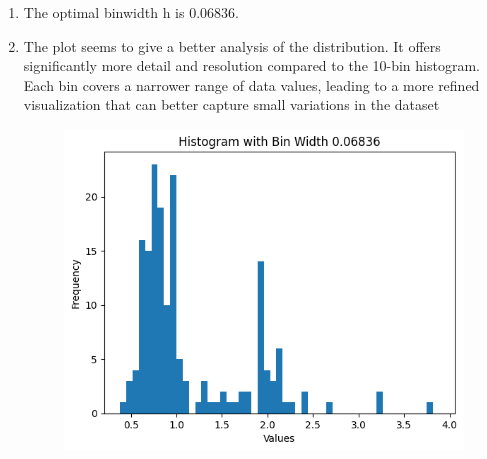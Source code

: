 \begin{enumerate}[label=(\alph*)]
\begin{figure}[H]
	      \end{figure}
	\item  The optimal binwidth h is 0.06836.
	\item  The plot seems to give a better analysis of the distribution. It  offers
	      significantly more detail and resolution compared to the 10-bin histogram. Each
	      bin covers a narrower range of data values, leading to a more refined
	      visualization that can better capture small variations in the dataset
	      \begin{figure}[H]
		      \centering
		      \includegraphics[width=0.7\linewidth]{../images/1/optimalhistogram.png}
	      \end{figure}
\end{enumerate}
